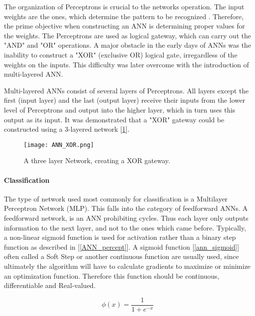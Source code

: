 	The organization of Perceptrons is crucial to the networks operation. The input weights are the ones, which determine the pattern to be recognized \cite{bishop1995neural}. Therefore, the prime objective when constructing an ANN is determining proper values for the weights. The Perceptrons are used as logical gateway, which can carry out the "AND" and "OR" operations. A major obstacle in the early days of ANNs was the inability to construct  a "XOR" (exclusive OR) logical gate, irregardless of the weights on the inputs. This difficulty was later overcome with the introduction of multi-layered ANN.
	
	Multi-layered ANNs consist of several layers of Perceptrons. All layers except the first (input layer) and the last (output layer) receive their inputs from the lower level of Perceptrons and output into the higher layer, which in turn uses this output as its input. It was demonstrated that a "XOR" gateway could be constructed using a 3-layered network [\ref{ANN_XOR}].
	
	\begin{figure}[h]
		\centering
		\captionsetup{width=0.8\textwidth}
		\texttt{[image: ANN\_XOR.png]}
		\caption[ANN XOR Perceptron-Network]{
			\footnotesize{
				A three layer Network, creating a XOR gateway.
			}
		} 
		\label{ANN_XOR}
	\end{figure}	
	
	
	\paragraph{Classification}
		The type of network used most commonly for classification is a Multilayer Perceptron Network (MLP). This falls into the category of feedforward ANNs. A feedforward network, is an ANN prohibiting cycles. Thus each layer only outputs information to the next layer, and not to the ones which came before. Typically, a non-linear sigmoid function is used for activation rather than a binary step function as described in [\ref{ANN_percept}]. A sigmoid function [\ref{ann_sigmoid}] often called a Soft Step or another continuous function are usually used, since ultimately the algorithm will have to calculate gradients to maximize or minimize an optimization function. Therefore this function should be continuous, differentiable and Real-valued.
		
		\begin{equation}
			\phi(x) = \frac{1}{1+ e^{-x}}
			\label{ann_sigmoid}
		\end{equation}
			
